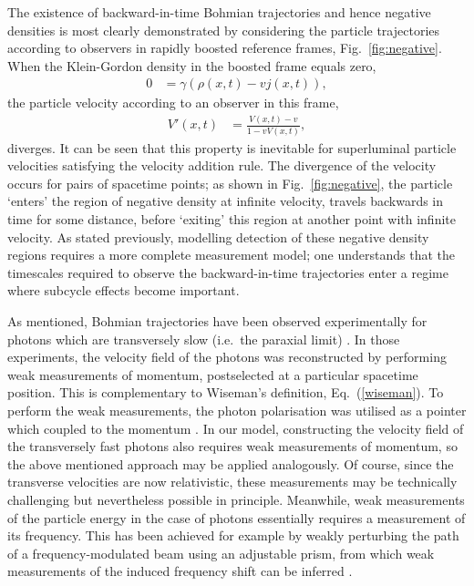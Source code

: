 \documentclass[
prx
,twocolumn
,nofootinbib
,floatfix
,superscriptaddress
]{revtex4-2}
\begin{document}
The existence of backward-in-time Bohmian trajectories and hence negative densities is most clearly demonstrated by considering the particle trajectories according to observers in rapidly boosted reference frames, Fig.\ \ref{fig:negative}. When the Klein-Gordon density in the boosted frame equals zero,
\begin{align}
    0 &= \gamma ( \rho(x,t) - vj(x,t) ) ,
\end{align}
the particle velocity according to an observer in this frame, 
\begin{align}
    V'(x,t) &= \frac{V(x,t) - v}{1 - v V(x,t)} ,
\end{align}
diverges. It can be seen that this property is inevitable for superluminal particle velocities satisfying the velocity addition rule. The divergence of the velocity occurs for pairs of spacetime points; as shown in Fig.\ \ref{fig:negative}, the particle `enters' the region of negative density at infinite velocity, travels backwards in time for some distance, before `exiting' this region at another point with infinite velocity. As stated previously, modelling detection of these negative density regions requires a more complete measurement model; one understands that the timescales required to observe the backward-in-time trajectories enter a regime where subcycle effects become important. 

As mentioned, Bohmian trajectories have been observed experimentally for photons which are transversely slow (i.e.\ the paraxial limit) \cite{kocsis2011observing, mahler2016experimental}. In those experiments, the velocity field of the photons was reconstructed by performing weak measurements of momentum, postselected at a particular spacetime position. This is complementary to Wiseman's definition, Eq.\ (\ref{wiseman}). To perform the weak measurements, the photon polarisation was utilised as a pointer which coupled to the momentum \cite{kocsis2011observing}. In our model, constructing the velocity field of the transversely fast photons also requires weak measurements of momentum, so the above mentioned approach may be applied analogously. Of course, since the transverse velocities are now relativistic, these measurements may be technically challenging but nevertheless possible in principle. Meanwhile, weak measurements of the particle energy in the case of photons essentially requires a measurement of its frequency. This has been achieved for example by weakly perturbing the path of a frequency-modulated beam using an adjustable prism, from which weak measurements of the induced frequency shift can be inferred \cite{starlingPhysRevA.82.063822,zhouPhysRevA.95.042121,dresselRevModPhys.86.307}. 
\end{document}
